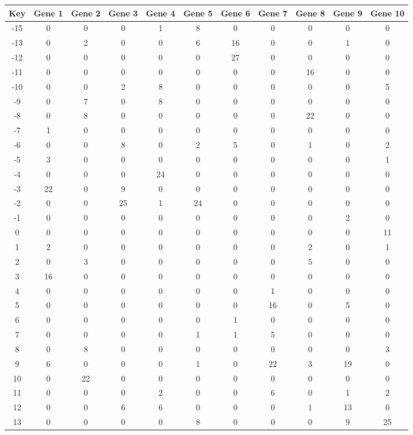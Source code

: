 \begin{tabular}{|c|c|c|c|c|c|c|c|c|c|c|}
\hline
Key & Gene 1 & Gene 2 & Gene 3 & Gene 4 & Gene 5 & Gene 6 & Gene 7 & Gene 8 & Gene 9 & Gene 10 \\
\hline
-15 & 0 & 0 & 0 & 1 & 8 & 0 & 0 & 0 & 0 & 0 \\
-13 & 0 & 2 & 0 & 0 & 6 & 16 & 0 & 0 & 1 & 0 \\
-12 & 0 & 0 & 0 & 0 & 0 & 27 & 0 & 0 & 0 & 0 \\
-11 & 0 & 0 & 0 & 0 & 0 & 0 & 0 & 16 & 0 & 0 \\
-10 & 0 & 0 & 2 & 8 & 0 & 0 & 0 & 0 & 0 & 5 \\
-9 & 0 & 7 & 0 & 8 & 0 & 0 & 0 & 0 & 0 & 0 \\
-8 & 0 & 8 & 0 & 0 & 0 & 0 & 0 & 22 & 0 & 0 \\
-7 & 1 & 0 & 0 & 0 & 0 & 0 & 0 & 0 & 0 & 0 \\
-6 & 0 & 0 & 8 & 0 & 2 & 5 & 0 & 1 & 0 & 2 \\
-5 & 3 & 0 & 0 & 0 & 0 & 0 & 0 & 0 & 0 & 1 \\
-4 & 0 & 0 & 0 & 24 & 0 & 0 & 0 & 0 & 0 & 0 \\
-3 & 22 & 0 & 9 & 0 & 0 & 0 & 0 & 0 & 0 & 0 \\
-2 & 0 & 0 & 25 & 1 & 24 & 0 & 0 & 0 & 0 & 0 \\
-1 & 0 & 0 & 0 & 0 & 0 & 0 & 0 & 0 & 2 & 0 \\
0 & 0 & 0 & 0 & 0 & 0 & 0 & 0 & 0 & 0 & 11 \\
1 & 2 & 0 & 0 & 0 & 0 & 0 & 0 & 2 & 0 & 1 \\
2 & 0 & 3 & 0 & 0 & 0 & 0 & 0 & 5 & 0 & 0 \\
3 & 16 & 0 & 0 & 0 & 0 & 0 & 0 & 0 & 0 & 0 \\
4 & 0 & 0 & 0 & 0 & 0 & 0 & 1 & 0 & 0 & 0 \\
5 & 0 & 0 & 0 & 0 & 0 & 0 & 16 & 0 & 5 & 0 \\
6 & 0 & 0 & 0 & 0 & 0 & 1 & 0 & 0 & 0 & 0 \\
7 & 0 & 0 & 0 & 0 & 1 & 1 & 5 & 0 & 0 & 0 \\
8 & 0 & 8 & 0 & 0 & 0 & 0 & 0 & 0 & 0 & 3 \\
9 & 6 & 0 & 0 & 0 & 1 & 0 & 22 & 3 & 19 & 0 \\
10 & 0 & 22 & 0 & 0 & 0 & 0 & 0 & 0 & 0 & 0 \\
11 & 0 & 0 & 0 & 2 & 0 & 0 & 6 & 0 & 1 & 2 \\
12 & 0 & 0 & 6 & 6 & 0 & 0 & 0 & 1 & 13 & 0 \\
13 & 0 & 0 & 0 & 0 & 8 & 0 & 0 & 0 & 9 & 25 \\
\hline
\end{tabular}